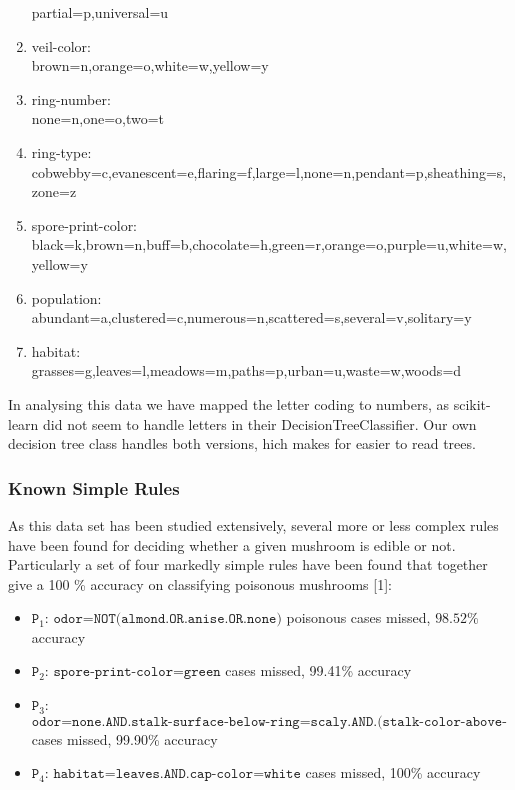 \documentclass[11pt]{article}
\begin{document}
\begin{enumerate}
	partial=p,universal=u
	\item veil-color: \\
	brown=n,orange=o,white=w,yellow=y
	\item ring-number: \\
	none=n,one=o,two=t
	\item ring-type: \\
	cobwebby=c,evanescent=e,flaring=f,large=l,none=n,pendant=p,sheathing=s,zone=z
	\item spore-print-color: \\
	black=k,brown=n,buff=b,chocolate=h,green=r,orange=o,purple=u,white=w,yellow=y
	\item population: \\
	abundant=a,clustered=c,numerous=n,scattered=s,several=v,solitary=y
	\item habitat: \\
	 grasses=g,leaves=l,meadows=m,paths=p,urban=u,waste=w,woods=d
\end{enumerate}
  In analysing this data we have mapped the letter coding to numbers, as scikit-learn did not seem to handle letters in their DecisionTreeClassifier. Our own decision tree class handles both versions, hich makes for easier to read trees.
  
    \hypertarget{known-simple-rules}{%
\subsubsection{Known Simple Rules}\label{known-simple-rules}}

As this data set has been studied extensively, several more or less
complex rules have been found for deciding whether a given mushroom is
edible or not. Particularly a set of four markedly simple rules have
been found that together give a 100 \% accuracy on classifying poisonous
mushrooms {[}1{]}:

\begin{itemize}
\item
  \(\texttt{P}_1\): $\texttt{odor=NOT(almond.OR.anise.OR.none)}$  poisonous cases missed, $98.52\%$ accuracy
\item
  \(\texttt{P}_2\): $\texttt{spore-print-color=green}$  cases missed, 99.41\%
  accuracy
\item
  \(\texttt{P}_3\): $\texttt{odor=none.AND.stalk-surface-below-ring=scaly.AND.(stalk-color-above-ring=NOT.brown)}$  cases missed, 99.90\% accuracy
\item
  \(\texttt{P}_4\): $\texttt{habitat=leaves.AND.cap-color=white}$  cases missed, 100\% accuracy
\end{itemize}
\end{document}
